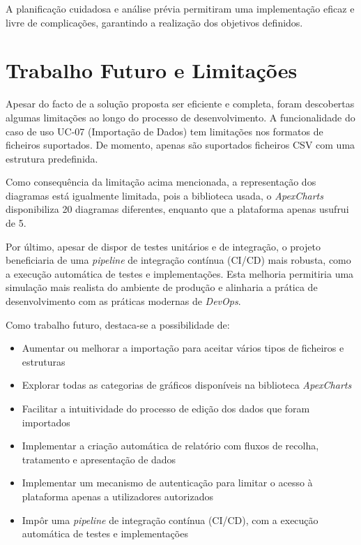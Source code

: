 A planificação cuidadosa e análise prévia permitiram uma implementação eficaz e livre de complicações, garantindo a realização dos objetivos definidos.

\section{Trabalho Futuro e Limitações}

Apesar do facto de a solução proposta ser eficiente e completa, foram descobertas algumas limitações ao longo do processo de desenvolvimento. A funcionalidade do caso de uso UC-07 (Importação de Dados) tem limitações nos formatos de ficheiros suportados. De momento, apenas são suportados ficheiros CSV com uma estrutura predefinida.

Como consequência da limitação acima mencionada, a representação dos diagramas está igualmente limitada, pois a biblioteca usada, o \textit{ApexCharts} disponibiliza 20 diagramas diferentes, enquanto que a plataforma apenas usufrui de 5.

Por último, apesar de dispor de testes unitários e de integração, o projeto beneficiaria de uma \textit{pipeline} de integração contínua (CI/CD) mais robusta, como a execução automática de testes e implementações. Esta melhoria permitiria uma simulação mais realista do ambiente de produção e alinharia a prática de desenvolvimento com as práticas modernas de \textit{DevOps}. 

Como trabalho futuro, destaca-se a possibilidade de:

\begin{itemize}
\item Aumentar ou melhorar a importação para aceitar vários tipos de ficheiros e estruturas
\item Explorar todas as categorias de gráficos disponíveis na biblioteca \textit{ApexCharts}
\item Facilitar a intuitividade do processo de edição dos dados que foram importados 
\item Implementar a criação automática de relatório com fluxos de recolha, tratamento e apresentação de dados
\item Implementar um mecanismo de autenticação para limitar o acesso à plataforma apenas a utilizadores autorizados
\item Impôr uma \textit{pipeline} de integração contínua (CI/CD), com a execução automática de testes e implementações
\end{itemize}


